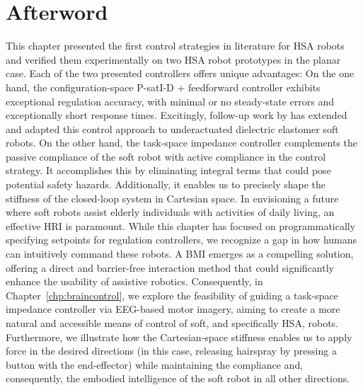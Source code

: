 \newpage






\section*{Afterword}
This chapter presented the first control strategies in literature for \gls{HSA} robots and verified them experimentally on two \gls{HSA} robot prototypes in the planar case.
Each of the two presented controllers offers unique advantages:
On the one hand, the configuration-space P-satI-D + feedforward controller exhibits exceptional regulation accuracy, with minimal or no steady-state errors and exceptionally short response times.
Excitingly, follow-up work by \citet{soleti2025model} has extended and adapted this control approach to underactuated dielectric elastomer soft robots.
On the other hand, the task-space impedance controller complements the passive compliance of the soft robot with active compliance in the control strategy. It accomplishes this by eliminating integral terms that could pose potential safety hazards. Additionally, it enables us to precisely shape the stiffness of the closed-loop system in Cartesian space.
In envisioning a future where soft robots assist elderly individuals with activities of daily living, an effective \gls{HRI} is paramount. While this chapter has focused on programmatically specifying setpoints for regulation controllers, we recognize a gap in how humans can intuitively command these robots. A \gls{BMI} emerges as a compelling solution, offering a direct and barrier-free interaction method that could significantly enhance the usability of assistive robotics. Consequently, in Chapter~\ref{chp:braincontrol}, we explore the feasibility of guiding a task-space impedance controller via \gls{EEG}-based motor imagery, aiming to create a more natural and accessible means of control of soft, and specifically \gls{HSA}, robots.
Furthermore, we illustrate how the Cartesian-space stiffness enables us to apply force in the desired directions (in this case, releasing hairspray by pressing a button with the end-effector) while maintaining the compliance and, consequently, the embodied intelligence of the soft robot in all other directions.